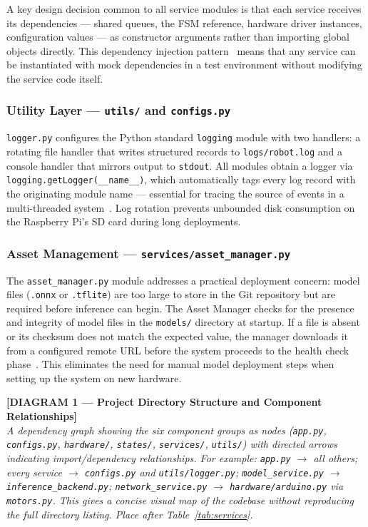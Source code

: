 \noindent A key design decision common to all service modules is that
each service receives its dependencies — shared queues, the FSM
reference, hardware driver instances, configuration values — as
constructor arguments rather than importing global objects directly.
This dependency injection pattern~\cite{gamma1994design} means that
any service can be instantiated with mock dependencies in a test
environment without modifying the service code itself.
 
\subsubsection{Utility Layer — \texttt{utils/} and \texttt{configs.py}}
 
\texttt{logger.py} configures the Python standard \texttt{logging}
module with two handlers: a rotating file handler that writes
structured records to \texttt{logs/robot.log} and a console handler
that mirrors output to \texttt{stdout}. All modules obtain a logger
via \texttt{logging.getLogger(\_\_name\_\_)}, which automatically tags
every log record with the originating module name — essential for
tracing the source of events in a multi-threaded
system~\cite{martin2008clean}. Log rotation prevents unbounded disk
consumption on the Raspberry Pi's SD card during long deployments.
 
\subsubsection{Asset Management — \texttt{services/asset\_manager.py}}
 
The \texttt{asset\_manager.py} module addresses a practical
deployment concern: model files (\texttt{.onnx} or \texttt{.tflite})
are too large to store in the Git repository but are required before
inference can begin. The Asset Manager checks for the presence and
integrity of model files in the \texttt{models/} directory at startup.
If a file is absent or its checksum does not match the expected value,
the manager downloads it from a configured remote URL before the
system proceeds to the health check phase~\cite{warden2019tinyml}.
This eliminates the need for manual model deployment steps when
setting up the system on new hardware.
 
\bigskip
\noindent\textbf{[DIAGRAM 1 — Project Directory Structure and
Component Relationships]}\\
\textit{A dependency graph showing the six component groups as nodes
(\texttt{app.py}, \texttt{configs.py}, \texttt{hardware/},
\texttt{states/}, \texttt{services/}, \texttt{utils/}) with directed
arrows indicating import/dependency relationships. For example:
\texttt{app.py} $\to$ all others; every service $\to$
\texttt{configs.py} and \texttt{utils/logger.py};
\texttt{model\_service.py} $\to$ \texttt{inference\_backend.py};
\texttt{network\_service.py} $\to$ \texttt{hardware/arduino.py} via
\texttt{motors.py}. This gives a concise visual map of the codebase
without reproducing the full directory listing. Place after
Table~\ref{tab:services}.}
\bigskip
 
